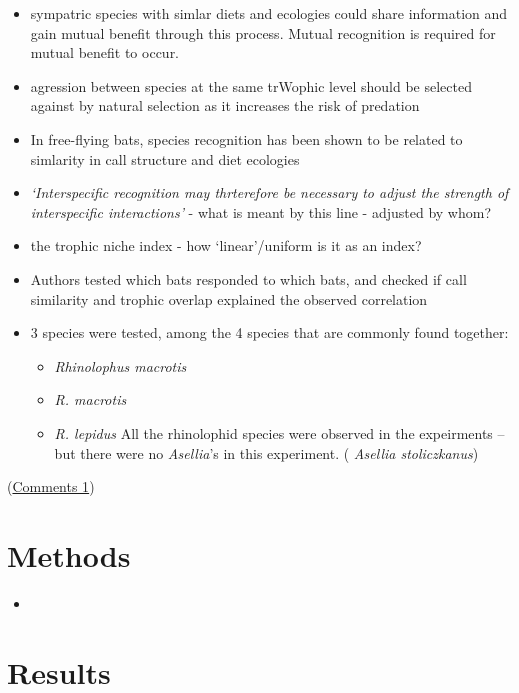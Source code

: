 \documentclass[
]{book}
\providecommand{\tightlist}{%
  \setlength{\itemsep}{0pt}\setlength{\parskip}{0pt}}
\begin{document}
\begin{itemize}
\tightlist
\item
  sympatric species with simlar diets and ecologies could share information and gain mutual benefit through this process. Mutual recognition is required for mutual benefit to occur.
\item
  agression between species at the same trWophic level should be selected against by natural selection as it increases the risk of predation
\item
  In free-flying bats, species recognition has been shown to be related to simlarity in call structure and diet ecologies
\item
  \emph{`Interspecific recognition may thrterefore be necessary to adjust the strength of interspecific interactions'} - what is meant by this line - adjusted by whom?
\item
  the trophic niche index - how `linear'/uniform is it as an index?
\item
  Authors tested which bats responded to which bats, and checked if call similarity and trophic overlap explained the observed correlation
\item
  3 species were tested, among the 4 species that are commonly found together:

  \begin{itemize}
  \tightlist
  \item
    \emph{Rhinolophus macrotis}
  \item
    \emph{R. macrotis}
  \item
    \emph{R. lepidus}
    All the rhinolophid species were observed in the expeirments --but there were no \emph{Asellia}'s in this experiment. ( \emph{Asellia stoliczkanus})
  \end{itemize}
\end{itemize}

(\protect\hyperlink{com_libehav}{Comments 1})

\hypertarget{methods-8}{%
\section{Methods}\label{methods-8}}

\begin{itemize}
\tightlist
\item
\end{itemize}

\hypertarget{results-8}{%
\section{Results}\label{results-8}}
\end{document}
